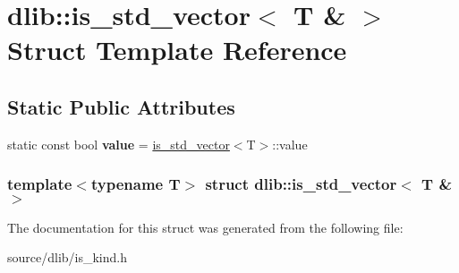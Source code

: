 \hypertarget{structdlib_1_1is__std__vector_3_01T_01_6_01_4}{
\section{dlib::is\_\-std\_\-vector$<$ T \& $>$ Struct Template Reference}
\label{structdlib_1_1is__std__vector_3_01T_01_6_01_4}
}
\subsection*{Static Public Attributes}
\begin{DoxyCompactItemize}
\item 
\hypertarget{structdlib_1_1is__std__vector_3_01T_01_6_01_4_a4a48b8853174a254bb75f54f77583785}{
static const bool {\bfseries value} = \hyperlink{structdlib_1_1is__std__vector}{is\_\-std\_\-vector}$<$T$>$::value}
\label{structdlib_1_1is__std__vector_3_01T_01_6_01_4_a4a48b8853174a254bb75f54f77583785}

\end{DoxyCompactItemize}
\subsubsection*{template$<$typename T$>$ struct dlib::is\_\-std\_\-vector$<$ T \& $>$}



The documentation for this struct was generated from the following file:\begin{DoxyCompactItemize}
\item 
source/dlib/is\_\-kind.h\end{DoxyCompactItemize}
